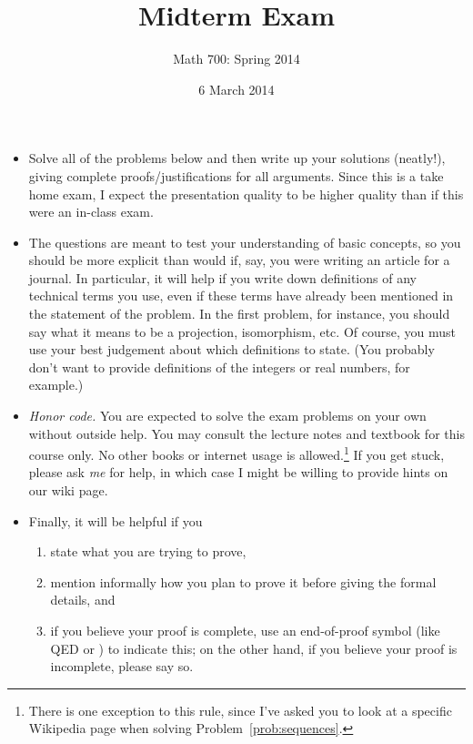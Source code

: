 \documentclass[11pt]{paper}
\author{}
\title{Midterm Exam}
\subtitle{Math 700: Spring 2014}
\date{6 March 2014}
\theoremstyle{remark}
\newcommand{\<}{\ensuremath{\langle}}
\renewcommand{\>}{\ensuremath{\rangle}}
\begin{document}
\maketitle

\begin{itemize}
\item 
Solve all of the problems below and then write up your solutions (neatly!),
giving complete proofs/justifications for all arguments.
Since this is a take home exam, I expect the presentation quality to be higher
quality than if this were an in-class exam.

\medskip

\item The questions are meant to test your understanding of basic  concepts, so you
should be more explicit than would if, say, you were writing an
article for a journal. In particular, it will help if you write down definitions
of any technical terms you use, even if these terms have already been mentioned
in the statement of the problem. In the first problem, for instance, you should
say what it means to be a projection, isomorphism, etc.  Of course, you must use your
best judgement about which definitions to state.  (You probably don't want to
provide definitions of the integers or real numbers, for example.)

\medskip

\item {\it Honor code.} You are expected to solve the exam problems on your own
  without outside help.  You may consult the lecture notes and textbook for this
  course only.  No other books or internet usage is allowed.\footnote{There is
    one exception to this rule, since I've asked you to look at a specific
    Wikipedia page when solving Problem~\ref{prob:sequences}.} 
  If you get stuck, please ask \emph{me} for
  help, in which case I might be willing to provide hints on our wiki page.

\item Finally, it will be helpful if you

\begin{enumerate}
\item 
state what you are trying to prove,
\item 
mention informally how you plan to prove it before giving the formal details, and
\item if you believe your proof is complete, use an end-of-proof symbol (like
  QED or \qedsymbol) to indicate this; on the other hand, if you believe your proof is
  incomplete, please say so.
\end{enumerate}
\end{itemize}
\end{document}

